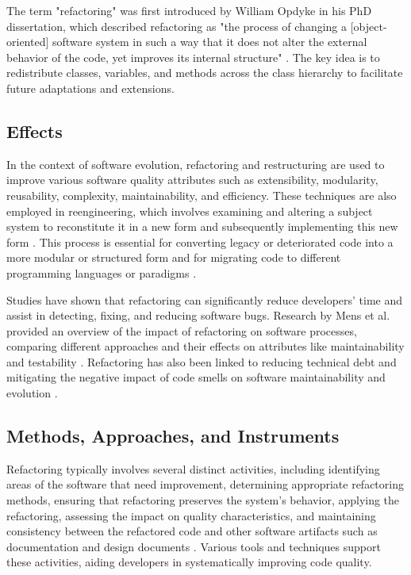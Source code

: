 The term "refactoring" was first introduced by William Opdyke in his PhD dissertation, which described refactoring as "the process of changing a [object-oriented] software system in such a way that it does not alter the external behavior of the code, yet improves its internal structure"  . The key idea is to redistribute classes, variables, and methods across the class hierarchy to facilitate future adaptations and extensions.

\subsection{Effects}
In the context of software evolution, refactoring and restructuring are used to improve various software quality attributes such as extensibility, modularity, reusability, complexity, maintainability, and efficiency. These techniques are also employed in reengineering, which involves examining and altering a subject system to reconstitute it in a new form and subsequently implementing this new form . This process is essential for converting legacy or deteriorated code into a more modular or structured form  and for migrating code to different programming languages or paradigms .

Studies have shown that refactoring can significantly reduce developers' time and assist in detecting, fixing, and reducing software bugs. Research by Mens et al. provided an overview of the impact of refactoring on software processes, comparing different approaches and their effects on attributes like maintainability and testability   . Refactoring has also been linked to reducing technical debt and mitigating the negative impact of code smells on software maintainability and evolution   .

\subsection{Methods, Approaches, and Instruments}
Refactoring typically involves several distinct activities, including identifying areas of the software that need improvement, determining appropriate refactoring methods, ensuring that refactoring preserves the system's behavior, applying the refactoring, assessing the impact on quality characteristics, and maintaining consistency between the refactored code and other software artifacts such as documentation and design documents   . Various tools and techniques support these activities, aiding developers in systematically improving code quality.

